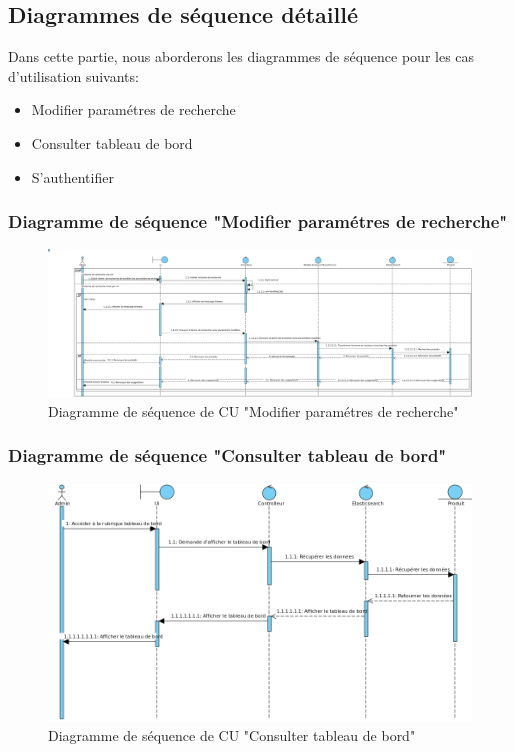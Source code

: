 \subsection{Diagrammes de séquence détaillé}
\noindent
Dans cette partie, nous aborderons les diagrammes de séquence pour les cas
d'utilisation suivants:
\begin{itemize}
	\item Modifier paramétres de recherche
	\item Consulter tableau de bord
	\item S'authentifier
\end{itemize}

\subsubsection{Diagramme de séquence "Modifier paramétres de recherche"}
\begin{figure}[H]
	\centering
	\includegraphics[width=\textwidth]{logos/modifierparametres.png}
	\caption{Diagramme de séquence de CU "Modifier paramétres de recherche"}
	\label{fig:modifierparametres}
\end{figure}


\subsubsection{Diagramme de séquence "Consulter tableau de bord"}
\begin{figure}[H]
	\centering
	\includegraphics[width=1\textwidth]{logos/consultertb.png}
	\caption{Diagramme de séquence de CU "Consulter tableau de bord"}
	\label{fig:seqconsultertb}
\end{figure}

